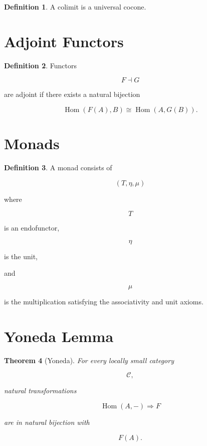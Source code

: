 \documentclass[11pt]{book}
\numberwithin{equation}{chapter}
\theoremstyle{definition}
\newtheorem{definition}{Definition}[chapter]
\theoremstyle{plain}
\newtheorem{theorem}[definition]{Theorem}
\begin{document}
\begin{definition}

A colimit is a universal cocone.

\end{definition}


\section{Adjoint Functors}

\begin{definition}

Functors

\[
F
\dashv
G
\]

are adjoint if there exists a natural bijection

\[
\operatorname{Hom}(F(A),B)
\cong
\operatorname{Hom}(A,G(B)).
\]

\end{definition}


\section{Monads}

\begin{definition}

A monad consists of

\[
(T,\eta,\mu)
\]

where

\[
T
\]

is an endofunctor,

\[
\eta
\]

is the unit,

and

\[
\mu
\]

is the multiplication satisfying the associativity and unit axioms.

\end{definition}


\section{Yoneda Lemma}

\begin{theorem}[Yoneda]

For every locally small category

\[
\mathcal C,
\]

natural transformations

\[
\operatorname{Hom}(A,-)
\Rightarrow
F
\]

are in natural bijection with

\[
F(A).
\]

\end{theorem}
\end{document}
